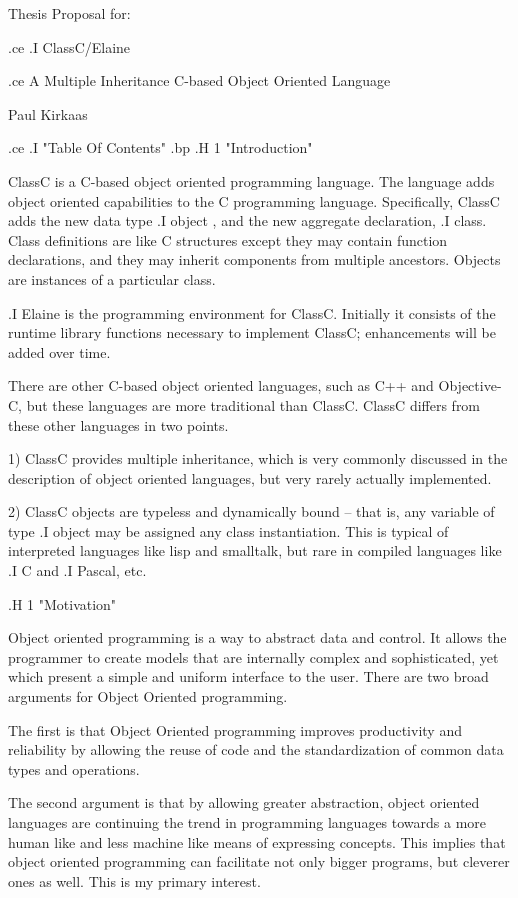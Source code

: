

Thesis Proposal for:

.ce
.I ClassC/Elaine

.ce
A Multiple Inheritance C-based Object Oriented Language


Paul Kirkaas

.ce
.I "Table Of Contents"
.bp
.H 1 "Introduction"

ClassC is a C-based object oriented programming language.  The language
adds object oriented capabilities to the C programming language.
Specifically, ClassC adds the new data type
.I object
, and the new aggregate declaration,
.I class.
Class definitions are like C
structures except they may contain function declarations, and they may
inherit components from multiple ancestors.  Objects are instances of
a particular class.

.I Elaine
is the programming environment for ClassC.  Initially it
consists of the runtime library functions necessary to implement
ClassC; enhancements will be added over time.

There are other C-based object oriented languages, such as C++ and
Objective-C, but these languages are more traditional than ClassC.  ClassC
differs from these other languages in two points.

  1) ClassC provides multiple inheritance, which is very commonly
discussed in the description of object oriented languages, but very
rarely actually implemented.

  2) ClassC objects are typeless and dynamically bound -- that is, any
variable of type
.I object
may be assigned any class instantiation.  This is typical of interpreted
languages like lisp and smalltalk, but rare in compiled languages like
.I C
and
.I Pascal,
etc.

.H 1 "Motivation"

Object oriented programming is a way to abstract data and
control.  It allows the programmer to create models that are internally
complex and sophisticated, yet which present a simple and uniform interface
to the user.  There are two broad arguments for Object Oriented
programming.

The first is that Object Oriented programming
improves productivity and reliability by allowing the reuse of code and the
standardization of common data types and operations.

The second argument is that by allowing greater abstraction, object
oriented languages are continuing the trend in programming languages
towards a more human like and less machine like means of expressing
concepts.  This implies that object oriented programming can facilitate
not only bigger programs, but cleverer ones as well.  This is my primary
interest.

